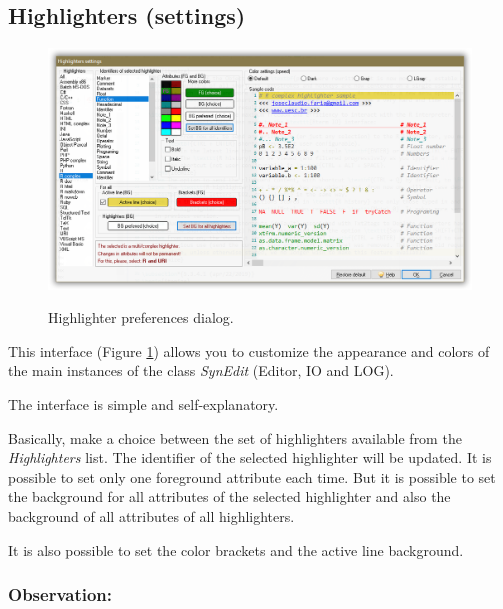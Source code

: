 \subsection{Highlighters (settings)}

\begin{figure}[H]
  \includegraphics[width=\headwidth]{./res/dlg_highlighter_settings.png}\\
  \caption{Highlighter preferences dialog.}
  \label{fig:dlg_highlighter_preferences}
\end{figure}
This interface
(Figure \ref{fig:dlg_highlighter_preferences})
allows you to customize the appearance and colors of the main
instances of the class \textit{SynEdit} (Editor, IO and LOG).

The interface is simple and self-explanatory.

Basically, make a choice between the set of highlighters available
from the \textit{Highlighters} list. The identifier of the selected
highlighter will be updated. It is possible to set only one
foreground attribute each time. But it is possible to set the
background for all attributes of the selected highlighter and also
the background of all attributes of all highlighters.

It is also possible to set the color brackets and the active line
background.

\subsubsection{Observation:}\\

